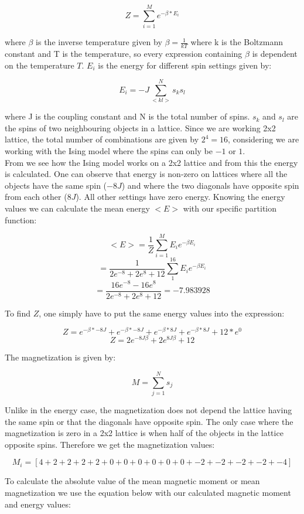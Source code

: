 \documentclass[10pt,a4paper]{article}
\begin{document}
$$
Z = \sum^{M}_{i = 1} e^{-\beta * E_i}
$$ 

\noindent where $\beta$ is the inverse temperature given by $\beta = \frac{1}{kT}$ where k is the Boltzmann constant and T is the temperature, so every expression containing $\beta$ is dependent on the temperature $T$. $E_i$ is the energy for different spin settings given by:

$$
E_i = -J\sum^{N}_{<kl>} s_ks_l
$$

\noindent where J is the coupling constant and N is the total number of spins. $s_k$ and $s_l$ are the spins of two neighbouring objects in a lattice. Since we are working 2x2 lattice, the total number of combinations are given by $2^4 = 16$, considering we are working with the Ising model where the spins can only be $-1$ or $1$.
\\
From  we see how the Ising model works on a 2x2 lattice and from this the energy is calculated. One can observe that energy is non-zero on lattices where all the objects have the same spin ($-8J$) and where the two diagonals have opposite spin from each other ($8J$). All other settings have zero energy. Knowing the energy values we can calculate the mean energy $<E>$ with our specific partition function:

$$
<E> = \frac{1}{Z}\sum^{M}_{i = 1} E_i e^{-\beta E_i}
$$
$$
 = \frac{1}{2e^{-8} + 2e^{8} + 12}\sum^{16}_{1} E_i e^{-\beta E_i}
$$
$$
 = \frac{16e^{-8}-16e^{8}}{2e^{-8} + 2e^{8} + 12} = -7.983928
$$

\noindent To find $Z$, one simply have to put the same energy values into the expression:

$$
Z = e^{-\beta * -8J} + e^{-\beta * -8J} + e^{-\beta * 8J} + e^{-\beta * 8J} + 12*e^0
$$
$$
Z = 2e^{-8J\beta} + 2e^{8J\beta} + 12
$$

\noindent The magnetization is given by:

$$
M = \sum^{N}_{j = 1} s_j
$$

\noindent Unlike in the energy case, the magnetization does not depend the lattice having the same spin or that the diagonals have opposite spin. The only case where the magnetization is zero in a 2x2 lattice is when half of the objects in the lattice opposite spins. Therefore we get the magnetization values:

$$
M_i = [4 + 2 + 2 + 2 + 2 + 0 + 0 + 0 + 0 + 0 + 0 + -2 + -2 + -2 + -2 + -4]
$$

\noindent To calculate the absolute value of the mean magnetic moment or mean magnetization we use the equation below with our calculated magnetic moment and energy values:
\end{document}
